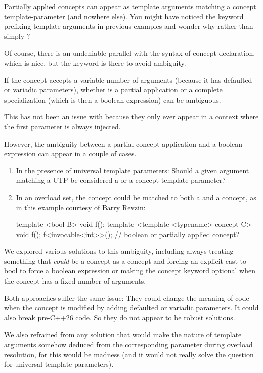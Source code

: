 \documentclass{wg21}
\begin{document}
Partially applied concepts can appear as template arguments matching a concept template-parameter (and nowhere else).
You might have noticed the  keyword prefixing template arguments in previous examples and wonder why  rather than simply ?

Of course, there is an undeniable parallel with the syntax of concept declaration, which is nice, but the keyword is there to avoid ambiguity.

If the concept accepts a variable number of arguments (because it has defaulted or variadic parameters),
whether  is a partial application or a complete specialization
(which is then a boolean expression) can be ambiguous.

This has not been an issue with  because they only ever appear in a context where the first parameter is always injected.

However, the ambiguity between a partial concept application and a boolean expression can appear in a couple of cases.
\begin{enumerate}
    \item In the presence of universal template parameters: Should a given argument matching a UTP be considered a  or a concept template-parameter?
    \item In an overload set, the concept could be matched to both a  and a concept, as in this example courtesy of Barry Revzin:
\begin{colorblock}
template <bool B> void f();
template <template <typename> concept C> void f();
f<invocable<int>>(); // boolean or partially applied concept?
\end{colorblock}
\end{enumerate}

We explored various solutions to this ambiguity, including always treating something that \emph{could} be a concept as a concept
and forcing an explicit cast to bool to force a boolean expression or making the concept keyword optional when the concept has a fixed number of arguments.

Both approaches suffer the same issue: They could change the meaning of code when the concept is modified by adding defaulted or variadic
parameters. It could also break pre-C++26 code.
So they do not appear to be robust solutions.

We also refrained from any solution that would make the nature of template arguments somehow deduced from the corresponding parameter during overload resolution, for this would be madness (and it would not really solve the question for universal template parameters).
\end{document}
